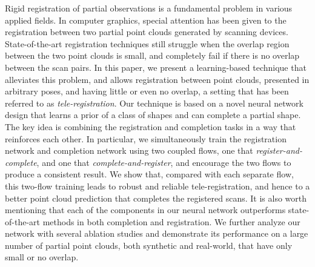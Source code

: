 Rigid registration of partial observations is a fundamental problem in various applied fields. In computer graphics, special attention has been given to the registration between two partial point clouds generated by scanning devices. State-of-the-art registration techniques still struggle when the overlap region between the two point clouds is small, and completely fail if there is no overlap between the scan pairs. In this paper, we present a learning-based technique that alleviates this problem, and allows registration between point clouds, presented in arbitrary poses, and having little or even no overlap, a setting that has been referred to as \emph{tele-registration}. Our technique is based on a novel neural network design that learns a prior of a class of shapes and can complete a partial shape. The key idea is combining the registration and completion tasks in a way that reinforces each other. In particular, we simultaneously train the registration network and completion network  using two coupled flows, one that \emph{register-and-complete}, and one that \emph{complete-and-register}, and encourage the two flows to produce a consistent result. We show that, compared with each separate flow, this two-flow training leads to robust and reliable tele-registration, and hence to a better point cloud prediction that completes the registered scans. It is also worth mentioning that each of the components in our neural network outperforms state-of-the-art methods in both completion and registration. We further analyze our network with several ablation studies and demonstrate its performance on a large number of partial point clouds, both synthetic and real-world, that have only small or no overlap.


